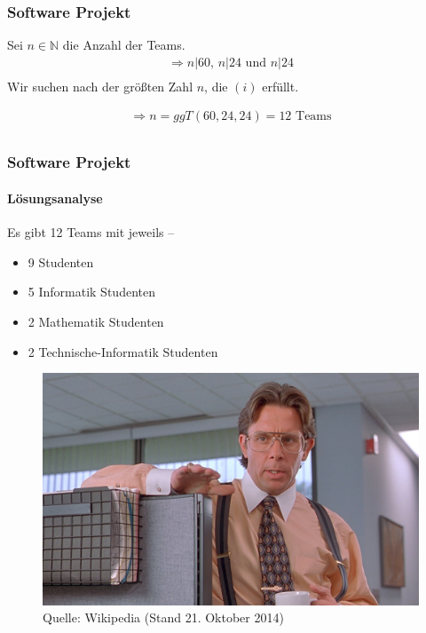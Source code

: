 \documentclass[•]{beamer}
\begin{document}
\begin{frame}
	\frametitle{Software Projekt}
	Sei $n \in \mathbb{N}$ die Anzahl der Teams.
	\begin{align*}
	\Rightarrow n|60 \text{, } n|24 \text{ und } n|24 \tag{i}\\
	\end{align*}
	Wir suchen nach der gr\"o{\ss}ten Zahl $n$, die $(i)$ erf\"ullt.
	
	\begin{align*}
	\Rightarrow n = \textit{ggT}(60,24,24) = 12 \text{ Teams}\\
	\end{align*}
	
\end{frame}

\begin{frame}
	\frametitle{Software Projekt}
	\framesubtitle{L\"osungsanalyse}
	Es gibt 12 Teams mit jeweils  --\\
	\begin{itemize}
	\item 9 Studenten
	\item 5 Informatik Studenten
	\item 2 Mathematik Studenten
	\item 2 Technische-Informatik Studenten
	\end{itemize}
\end{frame}

\begin{frame}
    \begin{figure}
	\centering
	\includegraphics[scale=0.4]{cicada}
	\caption*{\scriptsize{Quelle: Wikipedia (Stand 21. Oktober 2014)}}
	\end{figure}
\end{frame}
\end{document}

